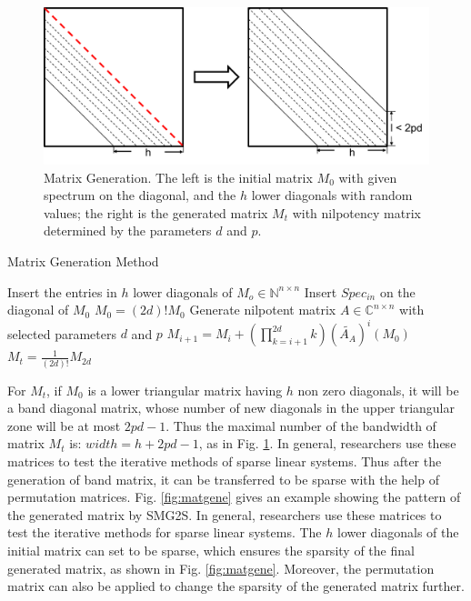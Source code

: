 \begin{figure}[t]
	\centering
	\includegraphics[width=5.8in]{fig/matgen.pdf}
	\caption{Matrix Generation. The left is the initial matrix $M_0$ with given spectrum on the diagonal, and the $h$ lower diagonals with random values; the right is the generated matrix $M_t$ with nilpotency matrix determined by the parameters $d$ and $p$.}
	\label{fig:matgen}
\end{figure}

\begin{algorithm*}[htbp]{}
	\caption{Matrix Generation Method}   
	\label{alg:matgen}   
	\begin{algorithmic}[1]
		\State Insert the entries in $h$ lower diagonals of $M_o \in \mathbb{N}^{n \times n}$
		\State Insert $Spec_{in}$ on the diagonal of $M_0$
		\State $M_0=(2d)!M_0$
		\State Generate nilpotent matrix $A \in \mathbb{C}^{n\times n}$ with selected parameters $d$ and $p$
		\State $M_{i+1}=M_i+(\prod_{k=i+1}^{2d}k)(\widetilde{A_A})^i(M_0)$
		\EndFor 
		\State $M_t = \frac{1}{(2d)!}M_{2d}$
		\EndFunction
	\end{algorithmic}
\end{algorithm*}

For $M_t$, if $M_0$ is a lower triangular matrix having $h$ non zero diagonals, it will be a band diagonal matrix, whose number of new diagonals in the upper triangular zone will be at most $2pd-1$. Thus the maximal number of the bandwidth of matrix $M_t$ is: $width = h + 2pd-1$, as in Fig. \ref{fig:matgen}. In general, researchers use these matrices to test the iterative methods of sparse linear systems. Thus after the generation of band matrix, it can be transferred to be sparse with the help of permutation matrices. Fig. \ref{fig:matgene} gives an example showing the pattern of the generated matrix by SMG2S. In general, researchers use these matrices to test the iterative methods for sparse linear systems. The $h$ lower diagonals of the initial matrix can set to be sparse, which ensures the sparsity of the final generated matrix, as shown in Fig. \ref{fig:matgene}. Moreover, the permutation matrix can also be applied to change the sparsity of the generated matrix further.

